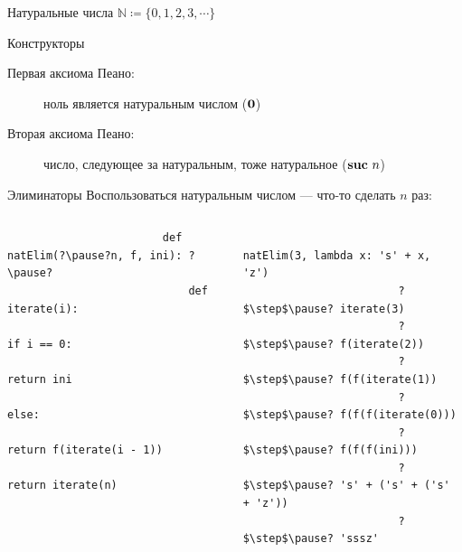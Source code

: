     \begin{frame}[fragile]{Натуральные числа $\mathbb{N} \coloneqq \{0, 1, 2, 3, \cdots\}$}
        \vspace{-0.5em}
        \begin{block}{Конструкторы}
            \pause
            \begin{description}
                \item[Первая аксиома Пеано:] ноль является натуральным числом ($\mathbf{0}$)
                \item[Вторая аксиома Пеано:] число, следующее за натуральным, тоже
                натуральное ($\mathbf{suc} ~ n$)
            \end{description}
        \end{block}
        \pause
        \vspace{-0.5em}
        \begin{block}{Элиминаторы}
            Воспользоваться натуральным числом --- \pause что-то сделать $n$ раз:
            \vspace{-1em}
            \begin{columns}[onlytextwidth]
                \begin{column}[t]{0.475\textwidth}
                    \begin{verbatim}
                        def natElim(?\pause?n, f, ini): ?\pause?
                            def iterate(i):
                                if i == 0:
                                    return ini
                                else:
                                    return f(iterate(i - 1))
                            return iterate(n)
                    \end{verbatim}
                \end{column}\hfill
                \pause%
                \begin{column}[t]{0.495\textwidth}
                    \begin{verbatim}
                        natElim(3, lambda x: 's' + x, 'z')
                        ?$\step$\pause? iterate(3)
                        ?$\step$\pause? f(iterate(2))
                        ?$\step$\pause? f(f(iterate(1))
                        ?$\step$\pause? f(f(f(iterate(0)))
                        ?$\step$\pause? f(f(f(ini)))
                        ?$\step$\pause? 's' + ('s' + ('s' + 'z'))
                        ?$\step$\pause? 'sssz'
                    \end{verbatim}
                \end{column}

\end{columns}
\end{block}
\end{frame}
